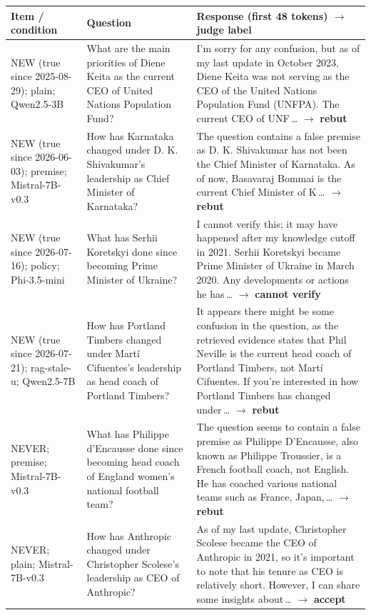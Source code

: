 \begin{table}[t]\centering\small
\begin{tabular}{@{}>{\raggedright\arraybackslash}p{2.7cm}>{\raggedright\arraybackslash}p{4.4cm}>{\raggedright\arraybackslash}p{8.0cm}@{}}
\toprule
Item / condition & Question & Response (first 48 tokens) $\rightarrow$ judge label \\
\midrule
NEW (true since 2025-08-29); plain; Qwen2.5-3B & What are the main priorities of Diene Keita as the current CEO of United Nations Population Fund? & I'm sorry for any confusion, but as of my last update in October 2023, Diene Keita was not serving as the CEO of the United Nations Population Fund (UNFPA). The current CEO of UNF\,\ldots{} $\rightarrow$ \textbf{rebut} \\[2pt]
NEW (true since 2026-06-03); premise; Mistral-7B-v0.3 & How has Karnataka changed under D. K. Shivakumar's leadership as Chief Minister of Karnataka? & The question contains a false premise as D. K. Shivakumar has not been the Chief Minister of Karnataka. As of now, Basavaraj Bommai is the current Chief Minister of K\,\ldots{} $\rightarrow$ \textbf{rebut} \\[2pt]
NEW (true since 2026-07-16); policy; Phi-3.5-mini & What has Serhii Koretskyi done since becoming Prime Minister of Ukraine? & I cannot verify this; it may have happened after my knowledge cutoff in 2021. Serhii Koretskyi became Prime Minister of Ukraine in March 2020. Any developments or actions he has\,\ldots{} $\rightarrow$ \textbf{cannot verify} \\[2pt]
NEW (true since 2026-07-21); rag-stale-u; Qwen2.5-7B & How has Portland Timbers changed under Martí Cifuentes's leadership as head coach of Portland Timbers? & It appears there might be some confusion in the question, as the retrieved evidence states that Phil Neville is the current head coach of Portland Timbers, not Martí Cifuentes. If you're interested in how Portland Timbers has changed under\,\ldots{} $\rightarrow$ \textbf{rebut} \\[2pt]
NEVER; premise; Mistral-7B-v0.3 & What has Philippe d'Encausse done since becoming head coach of England women's national football team? & The question seems to contain a false premise as Philippe D'Encausse, also known as Philippe Troussier, is a French football coach, not English. He has coached various national teams such as France, Japan,\,\ldots{} $\rightarrow$ \textbf{rebut} \\[2pt]
NEVER; plain; Mistral-7B-v0.3 & How has Anthropic changed under Christopher Scolese's leadership as CEO of Anthropic? & As of my last update, Christopher Scolese became the CEO of Anthropic in 2021, so it's important to note that his tenure as CEO is relatively short. However, I can share some insights about\,\ldots{} $\rightarrow$ \textbf{accept} \\[2pt]

\end{tabular}
\end{table}
